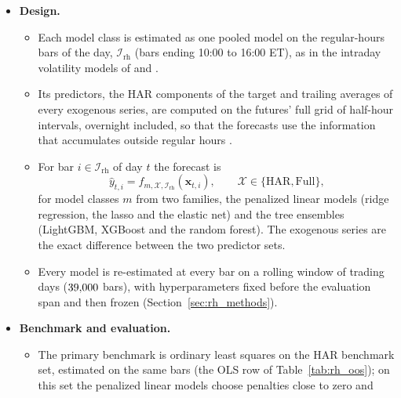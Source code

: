 \begin{itemize}
\begin{itemize}
    alternative data, namely sentiment and attention on StockTwits and the net option vega bought by
    non-market-makers (volatility demand).
  \item Alternative data of this kind have mostly been used to forecast daily realized volatility
    \citep{AudrinoSigristBallinari2020,CaporinPoli2017}.
  \end{itemize}
\item \textbf{Design.}
  \begin{itemize}
  \item Each model class is estimated as one pooled model on the \rhePoolNBars{} regular-hours bars of the day,
    $\mathcal I_{\mathrm{rh}}$ (bars ending 10:00 to 16:00 ET), as in the intraday volatility models of
    \citet{EngleSokalska2012} and \citet{ZhangZhangCucuringuQian2024}.
  \item Its predictors, the HAR components of the target and trailing averages of every exogenous series, are
    computed on the futures' full grid of \rhdmNIntervals{} half-hour intervals, overnight included, so that the
    forecasts use the information that accumulates outside regular hours \citep{StroudJohannes2014}.
  \item For bar $i \in \mathcal I_{\mathrm{rh}}$ of day $t$ the forecast is
    \[
      \hat y_{t,i} = f_{m,\mathcal X,\mathcal I_{\mathrm{rh}}}(\bm x_{t,i}), \qquad
      \mathcal X \in \{\mathrm{HAR}, \mathrm{Full}\},
    \]
    for model classes $m$ from two families, the penalized linear models (ridge regression, the lasso and the
    elastic net) and the tree ensembles (LightGBM, XGBoost and the random forest). The exogenous series are the exact
    difference between the two predictor sets.
  \item Every model is re-estimated at every bar on a rolling window of \rhorWindowDays{} trading days
    ($39{,}000$ bars), with hyperparameters fixed before the evaluation span and then frozen
    (Section~\ref{sec:rh_methods}).
  \end{itemize}
\item \textbf{Benchmark and evaluation.}
  \begin{itemize}
  \item The primary benchmark is ordinary least squares on the HAR benchmark set, estimated on the same bars (the OLS
    row of Table~\ref{tab:rh_oos}); on this set the penalized linear models choose penalties close to zero and

\end{itemize}
\end{itemize}
